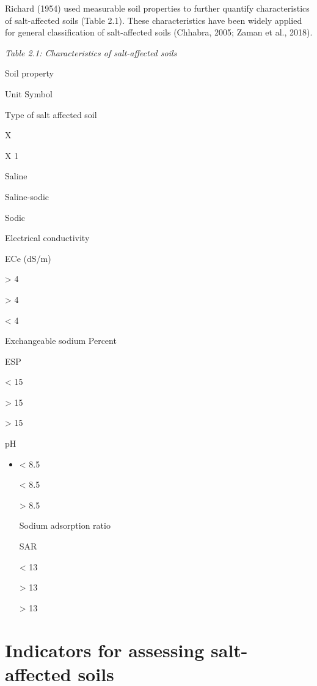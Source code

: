\documentclass[
  10pt,
  b5paper,
]{book}
\begin{document}
Richard (1954) used measurable soil properties to further quantify characteristics of salt-affected soils (Table 2.1). These characteristics have been widely applied for general classification of salt-affected soils (Chhabra, 2005; Zaman et al., 2018).

\emph{Table 2.1: Characteristics of salt-affected soils}

Soil property

Unit Symbol

Type of salt affected soil

X

X 1

Saline

Saline-sodic

Sodic

Electrical conductivity

ECe (dS/m)

\textgreater{} 4

\textgreater{} 4

\textless{} 4

Exchangeable sodium Percent

ESP

\textless{} 15

\textgreater{} 15

\textgreater{} 15

pH

\begin{itemize}
\item
  \textless{} 8.5

  \textless{} 8.5

  \textgreater{} 8.5

  Sodium adsorption ratio

  SAR

  \textless{} 13

  \textgreater{} 13

  \textgreater{} 13
\end{itemize}

\hypertarget{indicators-for-assessing-salt-affected-soils}{%
\section{Indicators for assessing salt-affected soils}\label{indicators-for-assessing-salt-affected-soils}}
\end{document}
